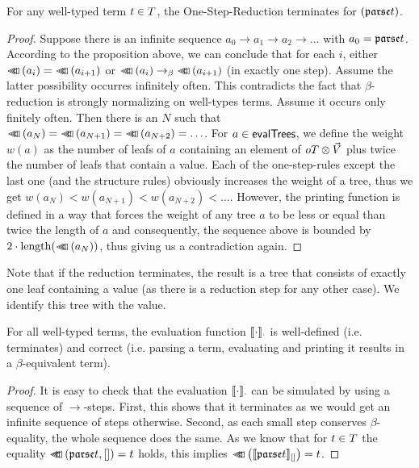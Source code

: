 \documentclass[submission,copyright,creativecommons]{eptcs}
\begin{document}
\begin{prop}
For any well-typed term $t \in T$, the One-Step-Reduction terminates for $(\mathfrak {parse } t)$.
\end{prop}
\begin{proof}
Suppose there is an infinite sequence $a_0 \rightarrow a_1 \rightarrow a_2 \rightarrow \ldots$ with $a_0 = \mathfrak {parse } t$. According to the proposition above, we can conclude that for each $i$, either $\prTree {a_i} = \prTree {a_{i+1}}$ or $\prTree {a_i} \rightarrow_\beta \prTree {a_{i+1}}$ (in exactly one step). Assume the latter possibility occurres infinitely often. This contradicts the fact that $\beta$-reduction is strongly normalizing on well-types terms. Assume it occurs only finitely often. Then there is an $N$ such that $\prTree {a_N} = \prTree {a_{N+1}} = \prTree {a_{N+2}} = \ldots$. For $a \in \mathsf{evalTrees}$, we define the weight $w(a)$ as the number of leafs of $a$ containing an element of $oT \otimes \vec {V}$ plus twice the number of leafs that contain a value. Each of the one-step-rules except the last one (and the structure rules) obviously increases the weight of a tree, thus we get $w(a_N) < w(a_{N+1}) < w(a_{N+2}) < \ldots$. However, the printing function is defined in a way that forces the weight of any tree $a$ to be less or equal than twice the length of $a$ and consequently, the sequence above is bounded by $2 \cdot \mbox{length}( \lhd \hspace{-8pt} \lhd \hspace{-8pt} \lhd \left( a_N \right))$, thus giving us a contradiction again.
\end{proof}

Note that if the reduction terminates, the result is a tree that consists of exactly one leaf containing a value (as there is a reduction step for any other case). We identify this tree with the value.

\begin{cor}
For all well-typed terms, the evaluation function $\llbracket{\cdot}\rrbracket_{\cdot}$ is well-defined (i.e. terminates) and correct (i.e. parsing a term, evaluating and printing it results in a $\beta$-equivalent term).
\end{cor}
\begin{proof}
It is easy to check that the evaluation $\llbracket{\cdot}\rrbracket_{\cdot}$ can be simulated by using a sequence of $\rightarrow$-steps. First, this shows that it terminates as we would get an infinite sequence of steps otherwise. Second, as each small step conserves $\beta$-equality, the whole sequence does the same. As we know that for $t \in T$ the equality $\lhd \hspace{-8pt} \lhd \hspace{-8pt} \lhd \left( \mathfrak {parse } t , [] \right) = t$ holds, this implies $\lhd \hspace{-8pt} \lhd \hspace{-8pt} \lhd \left( \llbracket{\mathfrak {parse }t}\rrbracket_{[]} \right) = t$. 
\end{proof}
\end{document}

